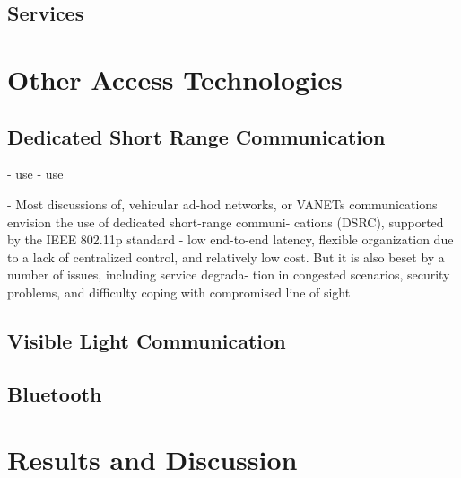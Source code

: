 \documentclass[conference,12pt,onecolumn]{IEEEtran}
\begin{document}
\subsection{Services}

\section{Other Access Technologies}
\subsection{Dedicated Short Range Communication}
- use \cite{kenney2011}
- use \cite{machardy2018}

- Most discussions of, vehicular ad-hod networks, or VANETs communications envision the use of dedicated short-range communi- cations (DSRC), supported by the IEEE 802.11p standard \cite{kenney2011}
- low end-to-end latency, flexible organization due to a lack of centralized control, and relatively low cost. But it is also beset by a number of issues, including service degrada- tion in congested scenarios, security problems, and difficulty coping with compromised line of sight \cite{kenney2011}

\subsection{Visible Light Communication}
\subsection{Bluetooth}

\section{Results and Discussion}
\end{document}
